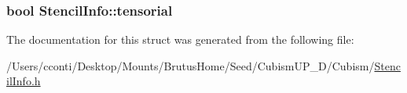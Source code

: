 \subsubsection[{tensorial}]{\setlength{\rightskip}{0pt plus 5cm}bool Stencil\+Info\+::tensorial}\label{struct_stencil_info_ab3fce74853afec119eee90a6274d1559}


The documentation for this struct was generated from the following file\+:\begin{DoxyCompactItemize}
\item 
/\+Users/cconti/\+Desktop/\+Mounts/\+Brutus\+Home/\+Seed/\+Cubism\+U\+P\+\_\+D/\+Cubism/\hyperlink{_stencil_info_8h}{Stencil\+Info.\+h}\end{DoxyCompactItemize}

